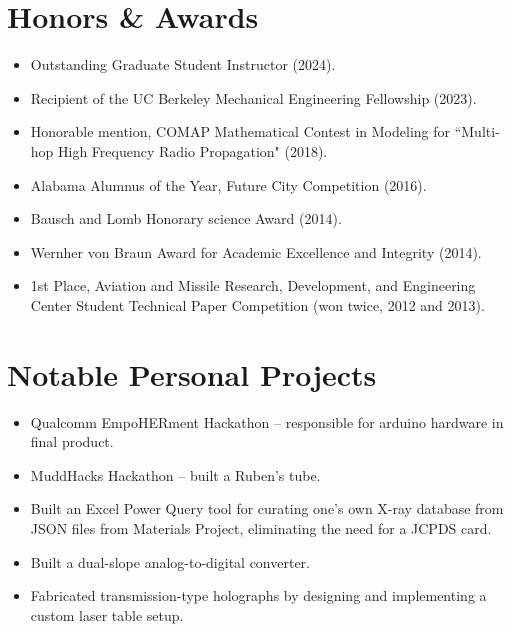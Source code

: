 \documentclass[letterpaper,10.8pt]{article}
\newcommand{\resumeItemNoTitle}[2]{\item\small{\textbf{#1}{ #2 \vspace{-2pt}}}}
\newcommand{\resumeSubHeadingListStart}{\begin{itemize}[leftmargin=*]}
\newcommand{\resumeSubHeadingListEnd}{\end{itemize}}
\begin{document}
\section{Honors \& Awards}
\resumeSubHeadingListStart
\resumeItemNoTitle{}{Outstanding Graduate Student Instructor (2024).} 
\resumeItemNoTitle{}{Recipient of the UC Berkeley Mechanical Engineering Fellowship (2023).}
\resumeItemNoTitle{}{Honorable mention, COMAP Mathematical Contest in Modeling for ``Multi-hop High Frequency Radio Propagation" (2018).}
\resumeItemNoTitle{}{Alabama Alumnus of the Year, Future City Competition (2016).}
\resumeItemNoTitle{}{Bausch and Lomb Honorary science Award (2014).}
\resumeItemNoTitle{}{Wernher von Braun Award for Academic Excellence and Integrity (2014).}
\resumeItemNoTitle{}{1st Place, Aviation and Missile Research, Development, and Engineering Center Student Technical Paper Competition (won twice, 2012 and 2013).}
\resumeSubHeadingListEnd

\section{Notable Personal Projects}
\resumeSubHeadingListStart  
\resumeItemNoTitle{}{Qualcomm EmpoHERment Hackathon -- responsible for arduino hardware in final product.}
\resumeItemNoTitle{}{MuddHacks Hackathon -- built a Ruben's tube.}
\resumeItemNoTitle{}{Built an Excel Power Query tool for curating one's own X-ray database from JSON files from Materials Project, eliminating the need for a JCPDS card.}
\resumeItemNoTitle{}{Built a dual-slope analog-to-digital converter.}
\resumeItemNoTitle{}{Fabricated transmission-type holographs by designing and implementing a custom laser table setup.}
\resumeSubHeadingListEnd
 
\end{document}
